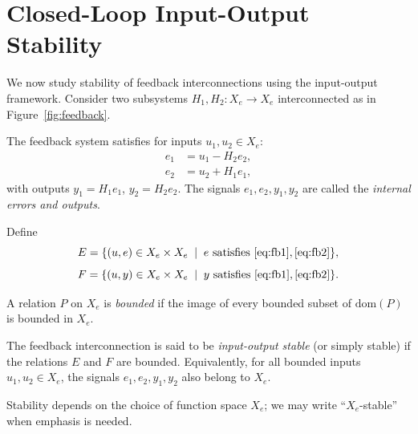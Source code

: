\section{Closed-Loop Input-Output Stability}

We now study stability of feedback interconnections using the input-output framework.  
Consider two subsystems $H_1, H_2 : X_e \to X_e$ interconnected as in Figure~\ref{fig:feedback}.

\begin{definition}
The feedback system satisfies for inputs $u_1,u_2 \in X_e$:
\begin{align}
e_1 &= u_1 - H_2 e_2, \label{eq:fb1}\\
e_2 &= u_2 + H_1 e_1, \label{eq:fb2}
\end{align}
with outputs $y_1 = H_1 e_1$, $y_2 = H_2 e_2$.  
The signals $e_1,e_2,y_1,y_2$ are called the \emph{internal errors and outputs}.
\end{definition}

\begin{definition}
Define
\begin{equation}
E = \{ (u,e) \in X_e \times X_e \;\mid\; e \text{ satisfies } \eqref{eq:fb1}, \eqref{eq:fb2}\},
\end{equation}
\begin{equation}
F = \{ (u,y) \in X_e \times X_e \;\mid\; y \text{ satisfies } \eqref{eq:fb1}, \eqref{eq:fb2}\}.
\end{equation}
\end{definition}

\begin{definition}[Boundedness]
A relation $P$ on $X_e$ is \emph{bounded} if the image of every bounded subset of $\mathrm{dom}(P)$ is bounded in $X_e$.
\end{definition}

\begin{definition}
The feedback interconnection is said to be \emph{input-output stable} (or simply stable) if the relations $E$ and $F$ are bounded.  
Equivalently, for all bounded inputs $u_1,u_2 \in X_e$, the signals $e_1,e_2,y_1,y_2$ also belong to $X_e$.
\end{definition}

\begin{remark}
Stability depends on the choice of function space $X_e$; we may write ``$X_e$-stable'' when emphasis is needed.
\end{remark}

